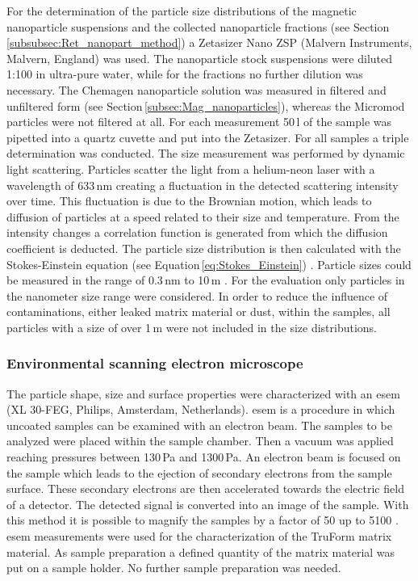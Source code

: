 For the determination of the particle size distributions of the magnetic nanoparticle suspensions and the collected nanoparticle fractions (see Section\,\ref{subsubsec:Ret_nanopart_method}) a Zetasizer Nano ZSP (Malvern Instruments, Malvern, England) was used. The nanoparticle stock suspensions were diluted 1:100 in ultra-pure water, while for the fractions no further dilution was necessary. The Chemagen nanoparticle solution was measured in filtered and unfiltered form (see Section\,\ref{subsec:Mag_nanoparticles}), whereas the Micromod particles were not filtered at all. For each measurement 50\,\textmu l of the sample was pipetted into a quartz cuvette and put into the Zetasizer. For all samples a triple determination was conducted. The size measurement was performed by dynamic light scattering. Particles scatter the light from a helium-neon laser with a wavelength of 633\,nm creating a fluctuation in the detected scattering intensity over time. This fluctuation is due to the Brownian motion, which leads to diffusion of particles at a speed related to their size and temperature. From the intensity changes a correlation function is generated from which the diffusion coefficient is deducted. The particle size distribution is then calculated with the Stokes-Einstein equation (see Equation\,\ref{eq:Stokes_Einstein}) \cite{berne2000dynamic}. Particle sizes could be measured in the range of 0.3\,nm to 10\,\textmu m \cite{Zetasizer}. For the evaluation only particles in the nanometer size range were considered. In order to reduce the influence of contaminations, either leaked matrix material or dust, within the samples, all particles with a size of over 1\,\textmu m were not included in the size distributions.

\subsubsection{Environmental scanning electron microscope}
\label{subsubsec:ESEM}
The particle shape, size and surface properties were characterized with an \gls{esem} (XL 30-FEG, Philips, Amsterdam, Netherlands). \gls{esem} is a procedure in which uncoated samples can be examined with an electron beam. The samples to be analyzed were placed within the sample chamber. Then a vacuum was applied reaching pressures between 130\,Pa and 1300\,Pa. An electron beam is focused on the sample which leads to the ejection of secondary electrons from the sample surface. These secondary electrons are then accelerated towards the electric field of a detector. The detected signal is converted into an image of the sample. With this method it is possible to magnify the samples by a factor of 50 up to 5100 \cite{danilatos1993introduction}.     
\gls{esem} measurements were used for the characterization of the TruForm matrix material. As sample preparation a defined quantity of the matrix material was put on a sample holder. No further sample preparation was needed.

